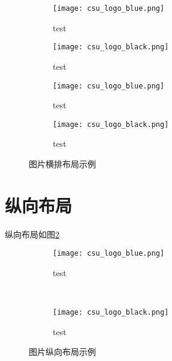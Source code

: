 \begin{figure}[!htb]
    \centering
    \begin{subfigure}[t]{0.24\linewidth}
        \captionsetup{justification=centering}
        \begin{minipage}[b]{1\linewidth}
        \texttt{[image: csu\_logo\_blue.png]}
        \caption{test}
        \end{minipage}
    \end{subfigure}
    \begin{subfigure}[t]{0.24\linewidth}
        \captionsetup{justification=centering}
        \begin{minipage}[b]{1\linewidth}
        \texttt{[image: csu\_logo\_black.png]}
        \caption{test}
        \end{minipage}
    \end{subfigure}
    \begin{subfigure}[t]{0.24\linewidth}
        \captionsetup{justification=centering}
        \begin{minipage}[b]{1\linewidth}
        \texttt{[image: csu\_logo\_blue.png]}
        \caption{test}
        \end{minipage}
    \end{subfigure}
    \begin{subfigure}[t]{0.24\linewidth}
        \captionsetup{justification=centering}
        \begin{minipage}[b]{1\linewidth}
        \texttt{[image: csu\_logo\_black.png]}
        \caption{test}
        \end{minipage}
    \end{subfigure}
    \caption{图片横排布局示例}
    \label{f.row}
\end{figure}

\section{纵向布局}

纵向布局如图\ref{f.col}

\begin{figure}[!htb]
    \centering
    \begin{subfigure}[t]{0.15\linewidth}
        \captionsetup{justification=centering} %
        \begin{minipage}[b]{1\linewidth}
        \texttt{[image: csu\_logo\_blue.png]}
        \caption{test}
        \end{minipage}
    \end{subfigure}\\
    \begin{subfigure}[t]{0.15\linewidth}
        \captionsetup{justification=centering} %
        \begin{minipage}[b]{1\linewidth}
        \texttt{[image: csu\_logo\_black.png]}
        \caption{test}
        \end{minipage}
    \end{subfigure}
    \caption{图片纵向布局示例}
    \label{f.col}
\end{figure}

